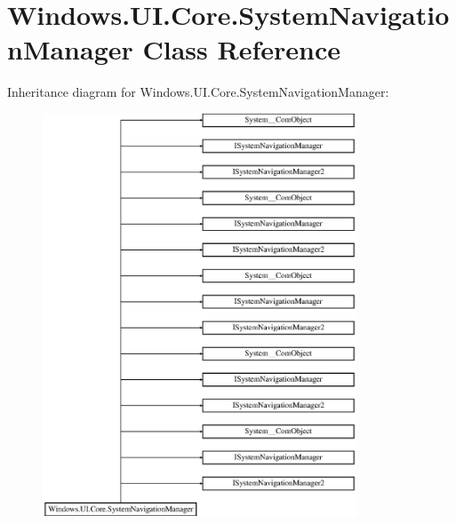 \hypertarget{class_windows_1_1_u_i_1_1_core_1_1_system_navigation_manager}{}\section{Windows.\+U\+I.\+Core.\+System\+Navigation\+Manager Class Reference}
\label{class_windows_1_1_u_i_1_1_core_1_1_system_navigation_manager}
Inheritance diagram for Windows.\+U\+I.\+Core.\+System\+Navigation\+Manager\+:\begin{figure}[H]
\begin{center}
\leavevmode
\includegraphics[height=12.000000cm]{class_windows_1_1_u_i_1_1_core_1_1_system_navigation_manager}
\end{center}
\end{figure}
